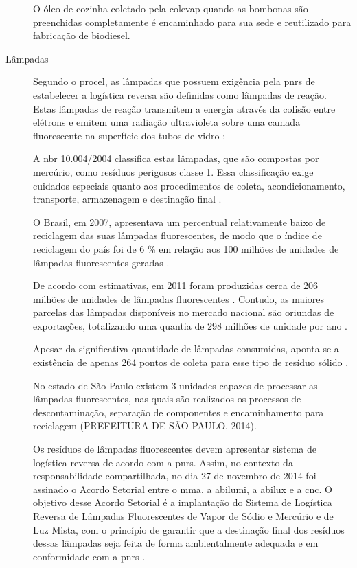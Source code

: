 \begin{description}
	O óleo de cozinha coletado pela \gls{colevap} quando as bombonas são preenchidas completamente é encaminhado para sua sede e reutilizado para fabricação de biodiesel.
	
	
	\item[Lâmpadas] Segundo o \gls{procel}, as lâmpadas que possuem exigência pela \gls{pnrs} de estabelecer a logística reversa são definidas como lâmpadas de reação. Estas lâmpadas de reação transmitem a energia através da colisão entre elétrons e emitem uma radiação ultravioleta sobre uma camada fluorescente na superfície dos tubos de vidro \cite{PROCEL2011};
	
	A \gls{nbr} 10.004/2004 classifica estas lâmpadas, que são compostas por mercúrio, como resíduos perigosos classe 1. Essa classificação exige cuidados especiais quanto aos procedimentos de coleta, acondicionamento, transporte, armazenagem e destinação final \cite{ABNT:10004}.
	
	O Brasil, em 2007, apresentava um percentual relativamente baixo de reciclagem das suas lâmpadas fluorescentes, de modo que o índice de reciclagem do país foi de 6 \% em relação aos 100 milhões de unidades de lâmpadas fluorescentes geradas \cite{Bacila2015}.
	
	De acordo com estimativas, em 2011 foram produzidas cerca de 206 milhões de unidades de lâmpadas fluorescentes \cite{Bacila2015}. Contudo, as maiores parcelas das lâmpadas disponíveis no mercado nacional são oriundas de exportações, totalizando uma quantia de 298 milhões de unidade por ano \cite{Mourao:2012}.
	
	Apesar da significativa quantidade de lâmpadas consumidas, aponta-se a existência de apenas 264 pontos de coleta para esse tipo de resíduo sólido \cite{Bacila2015}.
	
	No estado de São Paulo existem 3 unidades capazes de processar as lâmpadas fluorescentes, nas quais são realizados os processos de descontaminação, separação de componentes e encaminhamento para reciclagem (PREFEITURA DE SÃO PAULO, 2014).
	
	Os resíduos de lâmpadas fluorescentes devem apresentar sistema de logística reversa de acordo com a \gls{pnrs}. Assim, no contexto da responsabilidade compartilhada, no dia 27 de novembro de 2014 foi assinado o Acordo Setorial entre o \gls{mma}, a \gls{abilumi}, a \gls{abilux} e a \gls{cnc}. O objetivo desse Acordo Setorial é a implantação do Sistema de Logística Reversa de Lâmpadas Fluorescentes de Vapor de Sódio e Mercúrio e de Luz Mista, com o princípio de garantir que a destinação final dos resíduos dessas lâmpadas seja feita de forma ambientalmente adequada e em conformidade com a \gls{pnrs} \cite{Acordo2014}.
	

\end{description}
